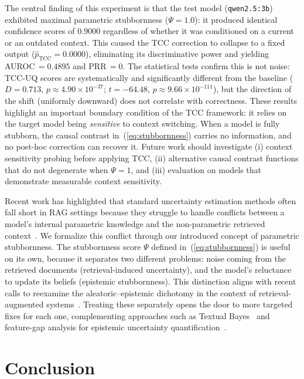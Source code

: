 \documentclass[twoside]{article}
\begin{document}
The central finding of this experiment is that the test model
(\texttt{qwen2.5:3b}) exhibited maximal parametric stubbornness
($\Psi = 1.0$): it produced identical confidence scores of $0.9000$
regardless of whether it was conditioned on a current or an outdated
context. This caused the TCC correction to collapse to a fixed output
($\hat{p}_{\mathrm{TCC}} = 0.0000$), eliminating its discriminative
power and yielding AUROC\,$= 0.4895$ and PRR\,$= 0$. The statistical
tests confirm this is not noise: TCC-UQ scores are systematically and
significantly different from the baseline ($D = 0.713$,
$p \approx 4.90\times10^{-37}$; $t = -64.48$,
$p \approx 9.66\times10^{-111}$), but the direction of the shift
(uniformly downward) does not correlate with correctness. These results highlight an important boundary condition of the TCC
framework: it relies on the target model being \emph{sensitive} to
context switching. When a model is fully stubborn, the causal contrast
in~(\ref{eq:stubbornness}) carries no information, and no post-hoc
correction can recover it. Future work should investigate (i) context
sensitivity probing before applying TCC, (ii) alternative causal
contrast functions that do not degenerate when $\Psi = 1$, and (iii)
evaluation on models that demonstrate measurable context sensitivity.

Recent work has highlighted that standard uncertainty estimation
methods often fall short in RAG settings because they struggle to handle
conflicts between a model's internal parametric knowledge and the 
non-parametric retrieved context~\cite{soudani2025uncertainty}. We formalize this conflict 
through our introduced concept of parametric stubbornness. The stubbornness score $\Psi$ defined in~(\ref{eq:stubbornness}) is
useful on its own, because it separates two different problems:
noise coming from the retrieved documents (retrieval-induced
uncertainty), and the model's reluctance to update its beliefs
(epistemic stubbornness). This distinction aligns with recent calls to
reexamine the aleatoric--epistemic dichotomy in the context of
retrieval-augmented systems~\cite{kirchhof2025reexamining}.
Treating these separately opens the door to more targeted fixes for
each one, complementing approaches such as Textual Bayes~\cite{ross2025textual}
and feature-gap analysis for epistemic uncertainty quantification~\cite{bakman2025uncertainty}.

\section*{Conclusion}
\end{document}
